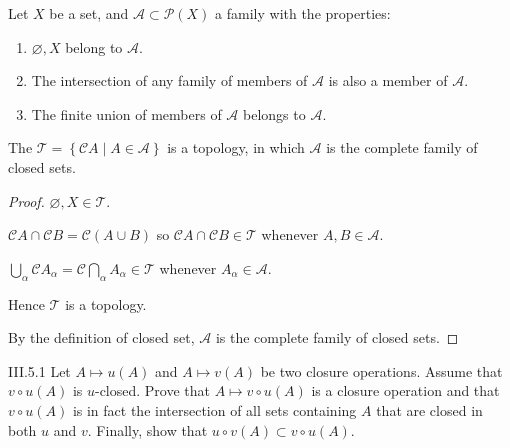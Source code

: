 \begin{proposition}{5.5}
    Let \(X\) be a set, and \(\mathscr{A} \subset \mathscr{P}(X)\) a family with the properties:
    \begin{enumerate}[label={(\arabic*)}]
        \item \( \varnothing, X \) belong to \(\mathscr{A}\).
        \item The intersection of any family of members of \(\mathscr{A}\) is also a member of \(\mathscr{A}\).
        \item The finite union of members of \(\mathscr{A}\) belongs to \(\mathscr{A}\).
    \end{enumerate}

    The \( \mathscr{T} = \left\{ \mathscr{C}A \mid A \in \mathscr{A} \right\} \) is a topology, in which \( \mathscr{A} \) is the complete family of closed sets.
\end{proposition}

\begin{proof}
    \( \varnothing, X \in \mathscr{T} \).

    \( \mathscr{C}A \cap \mathscr{C}B = \mathscr{C}(A \cup B) \) so \( \mathscr{C}A \cap \mathscr{C}B \in \mathscr{T} \) whenever \( A, B \in \mathscr{A} \).

    \( \bigcup_{\alpha} \mathscr{C}A_{\alpha} = \mathscr{C}\bigcap_{\alpha}A_{\alpha} \in \mathscr{T} \) whenever \( A_{\alpha} \in \mathscr{A} \).

    Hence \( \mathscr{T} \) is a topology.

    By the definition of closed set, \( \mathscr{A} \) is the complete family of closed sets.
\end{proof}

\begin{problem}{III.5.1}
Let \(A \mapsto u(A)\) and \(A \mapsto v(A)\) be two closure operations. Assume that \( v\circ u(A) \) is \(u\)-closed. Prove that \( A \mapsto v\circ u(A) \) is a closure operation and that \(v\circ u(A)\) is in fact the intersection of all sets containing \(A\) that are closed in both \(u\) and \(v\). Finally, show that \(u\circ v(A) \subset v\circ u(A)\).
\end{problem}

